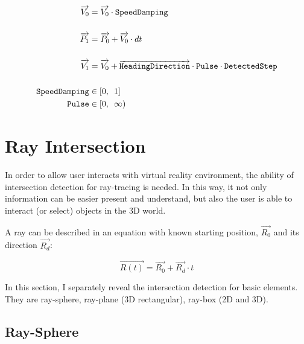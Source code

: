 \[
\begin{array}{lr}
\begin{aligned}
\overrightarrow{V_0} &= \overrightarrow{V_0} \cdot \texttt{SpeedDamping}\\\\
\overrightarrow{P_1} &= \overrightarrow{P_0} + \overrightarrow{V_0} \cdot dt\\\\
\overrightarrow{V_1} &= \overrightarrow{V_0} + \overrightarrow{\texttt{HeadingDirection}} \cdot \texttt{Pulse} \cdot \texttt{DetectedStep}\\\\
\texttt{SpeedDamping} &\in [0,\enspace1]\\
\texttt{Pulse} &\in [0,\enspace \infty)\\
\end{aligned}
\end{array}
\]

\section{Ray Intersection}

In order to allow user interacts with virtual reality environment, the ability of intersection detection for ray-tracing is needed. In this way, it not only information can be easier present and understand, but also the user is able to interact (or select) objects in the 3D world.

A ray can be described in an equation with known starting position, $\overrightarrow{R_0}$ and its direction $\overrightarrow{R_d}$:

\begin{equation}
\label{equ:ray-t}
\overrightarrow{R(t)} = \overrightarrow{R_0} + \overrightarrow{R_d} \cdot t
\end{equation}

In this section, I separately reveal the intersection detection for basic elements. They are ray-sphere, ray-plane (3D rectangular), ray-box (2D and 3D).

\subsection{Ray-Sphere}
\label{section:ray-sphere}

